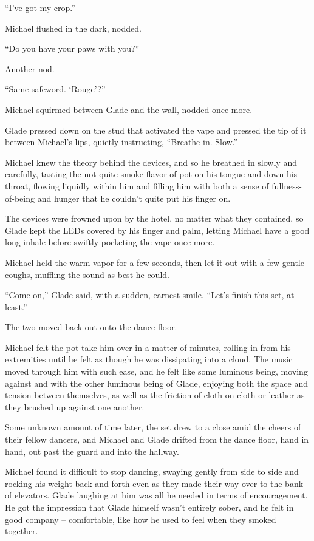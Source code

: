 ``I've got my crop.''

Michael flushed in the dark, nodded.

``Do you have your paws with you?''

Another nod.

``Same safeword.  `Rouge'?''

Michael squirmed between Glade and the wall, nodded once more.

Glade pressed down on the stud that activated the vape and pressed the tip of it between Michael's lips, quietly instructing, ``Breathe in.  Slow.''

Michael knew the theory behind the devices, and so he breathed in slowly and carefully, tasting the not-quite-smoke flavor of pot on his tongue and down his throat, flowing liquidly within him and filling him with both a sense of fullness-of-being and hunger that he couldn't quite put his finger on.

The devices were frowned upon by the hotel, no matter what they contained, so Glade kept the LEDs covered by his finger and palm, letting Michael have a good long inhale before swiftly pocketing the vape once more.

Michael held the warm vapor for a few seconds, then let it out with a few gentle coughs, muffling the sound as best he could.

``Come on,'' Glade said, with a sudden, earnest smile.  ``Let's finish this set, at least.''

The two moved back out onto the dance floor.

Michael felt the pot take him over in a matter of minutes, rolling in from his extremities until he felt as though he was dissipating into a cloud.  The music moved through him with such ease, and he felt like some luminous being, moving against and with the other luminous being of Glade, enjoying both the space and tension between themselves, as well as the friction of cloth on cloth or leather as they brushed up against one another.

Some unknown amount of time later, the set drew to a close amid the cheers of their fellow dancers, and Michael and Glade drifted from the dance floor, hand in hand, out past the guard and into the hallway.

Michael found it difficult to stop dancing, swaying gently from side to side and rocking his weight back and forth even as they made their way over to the bank of elevators.  Glade laughing at him was all he needed in terms of encouragement.  He got the impression that Glade himself wasn't entirely sober, and he felt in good company -- comfortable, like how he used to feel when they smoked together.

